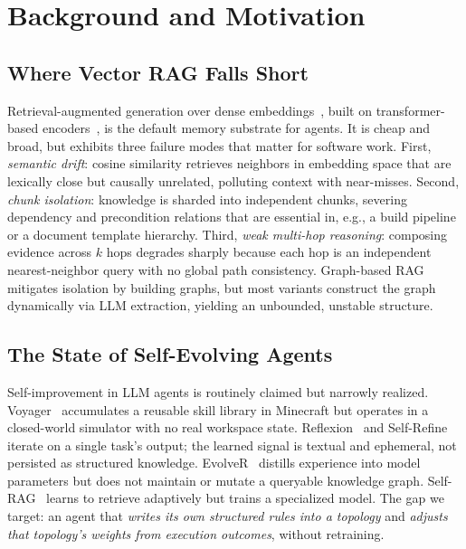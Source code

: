 \documentclass[sigconf]{acmart}
\begin{document}
\section{Background and Motivation}\label{sec:bg}

\subsection{Where Vector RAG Falls Short}\label{sec:bg:rag}
Retrieval-augmented generation over dense embeddings~\cite{lewis2020rag,johnson2019faiss}, built on transformer-based encoders~\cite{vaswani2017attention,brown2020gpt3,openai2023gpt4}, is the default memory substrate for agents. It is cheap and broad, but exhibits three failure modes that matter for software work. First, \emph{semantic drift}: cosine similarity retrieves neighbors in embedding space that are lexically close but causally unrelated, polluting context with near-misses. Second, \emph{chunk isolation}: knowledge is sharded into independent chunks, severing dependency and precondition relations that are essential in, e.g., a build pipeline or a document template hierarchy. Third, \emph{weak multi-hop reasoning}: composing evidence across $k$ hops degrades sharply because each hop is an independent nearest-neighbor query with no global path consistency. Graph-based RAG~\cite{edge2024graphrag,gutierrez2024hipporag,guo2024lightrag,soman2024kgrag} mitigates isolation by building graphs, but most variants construct the graph dynamically via LLM extraction, yielding an unbounded, unstable structure.

\subsection{The State of Self-Evolving Agents}\label{sec:bg:evo}
Self-improvement in LLM agents is routinely claimed but narrowly realized. Voyager~\cite{wang2023voyager} accumulates a reusable skill library in Minecraft but operates in a closed-world simulator with no real workspace state. Reflexion~\cite{shinn2023reflexion} and Self-Refine~\cite{madaan2023selfrefine} iterate on a single task's output; the learned signal is textual and ephemeral, not persisted as structured knowledge. EvolveR~\cite{xu2026evolver} distills experience into model parameters but does not maintain or mutate a queryable knowledge graph. Self-RAG~\cite{asai2023selfrag} learns to retrieve adaptively but trains a specialized model. The gap we target: an agent that \emph{writes its own structured rules into a topology} and \emph{adjusts that topology's weights from execution outcomes}, without retraining.
\end{document}
